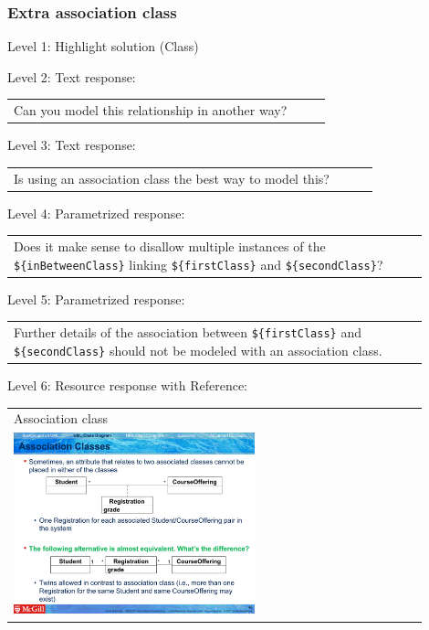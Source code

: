 \subsubsection{Extra association class}

\noindent Level 1: Highlight solution (Class) \medskip

\noindent Level 2: Text response: \medskip

\begin{tabular}{|p{0.9\linewidth}}
Can you model this relationship in another way?
\end{tabular} \medskip

\noindent Level 3: Text response: \medskip

\begin{tabular}{|p{0.9\linewidth}}
Is using an association class the best way to model this?
\end{tabular} \medskip

\noindent Level 4: Parametrized response: \medskip

\begin{tabular}{|p{0.9\linewidth}}
Does it make sense to disallow multiple instances of the \verb|${inBetweenClass}| linking \verb|${firstClass}| and \verb|${secondClass}|?
\end{tabular} \medskip

\noindent Level 5: Parametrized response: \medskip

\begin{tabular}{|p{0.9\linewidth}}
Further details of the association between \verb|${firstClass}| and \verb|${secondClass}| should not be modeled with an association class.
\end{tabular} \medskip

\noindent Level 6: Resource response with Reference: \medskip

\begin{tabular}{|p{0.9\linewidth}}
Association class

\\
\includegraphics[width=0.6\textwidth]{images/association_class.png}
\end{tabular} \medskip


